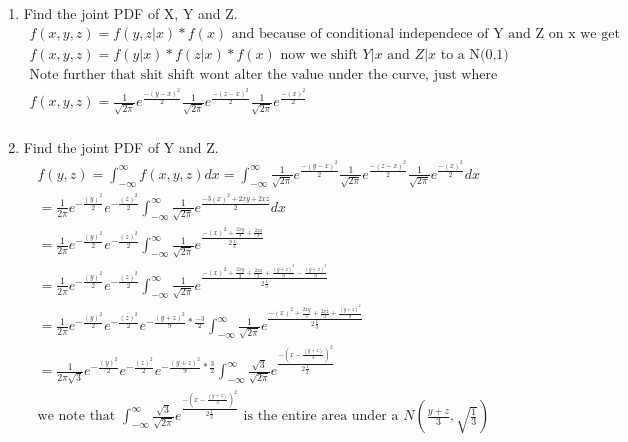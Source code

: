 \documentclass[11pt]{article}
\begin{document}
\begin{enumerate}
\begin{enumerate}
	\item Find the joint PDF of X, Y and Z.
	\begin{gather}
		f(x,y,z) = f(y,z|x)*f(x) \text{ and because of conditional independece of Y and Z on x we get} \\
		f(x,y,z) = f(y|x)*f(z|x)*f(x) \text{ now we shift $Y|x$ and $Z|x$ to a N(0,1)}\\
		\text{Note further that shit shift wont alter the value under the curve, just where the density takes place}\\
			f(x,y,z) = \frac{1}{\sqrt{2\pi}} e ^ {\frac{-(y-x)^2}{2}} \frac{1}{\sqrt{2\pi}} e ^ {\frac{-(z-x)^2}{2}} \frac{1}{\sqrt{2\pi}} e ^ {\frac{-(x)^2}{2}} \\
	\end{gather}
	\item Find the joint PDF of Y and Z.
	\begin{gather}
		f(y,z) = \int_{-\infty}^{\infty} f(x,y,z) dx =  \int_{-\infty}^{\infty} \frac{1}{\sqrt{2\pi}} e ^ {\frac{-(y-x)^2}{2}} \frac{1}{\sqrt{2\pi}} e ^ {\frac{-(z-x)^2}{2}} \frac{1}{\sqrt{2\pi}} e ^ {\frac{-(x)^2}{2}} dx\\
		=\frac{1}{2\pi} e ^ {-\frac{(y)^2}{2}} e ^ {-\frac{(z)^2}{2}}   \int_{-\infty}^{\infty} \frac{1}{\sqrt{2\pi}} e ^ {\frac{-3(x)^2 +2xy+2xz}{2}} dx \\
		= \frac{1}{2\pi} e ^ {-\frac{(y)^2}{2}} e ^ {-\frac{(z)^2}{2}}   \int_{-\infty}^{\infty} \frac{1}{\sqrt{2\pi}} e ^ {\frac{-(x)^2 +\frac{2xy}{3}+\frac{2xz}{3}}{2\frac{1}{3}}}\\
		=\frac{1}{2\pi} e ^ {-\frac{(y)^2}{2}} e ^ {-\frac{(z)^2}{2}}   \int_{-\infty}^{\infty} \frac{1}{\sqrt{2\pi}} e ^ {\frac{-(x)^2 +\frac{2xy}{3}+\frac{2xz}{3} + \frac{(y+z)^2}{9} - \frac{(y+z)^2}{9}} {2\frac{1}{3}}}\\
		=\frac{1}{2\pi} e ^ {-\frac{(y)^2}{2}} e ^ {-\frac{(z)^2}{2}} e^{- \frac{(y+z)^2}{9} * \frac{-3}{2}}   \int_{-\infty}^{\infty} \frac{1}{\sqrt{2\pi}} e ^ {\frac{-(x)^2 +\frac{2xy}{3}+\frac{2xz}{3} + \frac{(y+z)^2}{9}} {2\frac{1}{3}}}\\
		=\frac{1}{2\pi\sqrt{3}} e ^ {-\frac{(y)^2}{2}} e ^ {-\frac{(z)^2}{2}} e^{- \frac{(y+z)^2}{9} * \frac{3}{2}}   \int_{-\infty}^{\infty} \frac{\sqrt{3}}{\sqrt{2\pi}} e ^ {\frac{-(x-\frac{(y+z)}{3})^2} {2\frac{1}{3}}}\\
		\text{we note that } \int_{-\infty}^{\infty} \frac{\sqrt{3}}{\sqrt{2\pi}} e ^ {\frac{-(x-\frac{(y+z)}{3})^2} {2\frac{1}{3}}} \text{ is the entire area under a }N(\frac{y+z}{3},\sqrt{\frac{1}{3}})\\

\end{gather}
\end{enumerate}
\end{enumerate}
\end{document}
